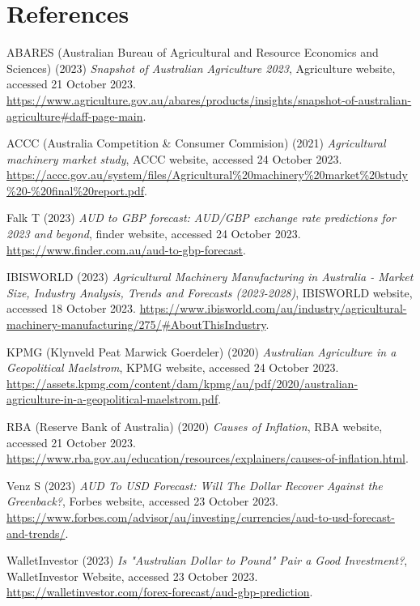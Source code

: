 \documentclass{article}
\begin{document}
\break

\section*{References}

\vspace{1em}

\noindent
ABARES (Australian Bureau of Agricultural and Resource Economics and Sciences) (2023) \emph{Snapshot of Australian Agriculture 2023}, Agriculture website, accessed 21 October 2023. \url{https://www.agriculture.gov.au/abares/products/insights/snapshot-of-australian-agriculture#daff-page-main}.

\vspace{1em}

\noindent
ACCC (Australia Competition \& Consumer Commision) (2021) \emph{Agricultural machinery market study}, ACCC website, accessed 24 October 2023. \url{https://accc.gov.au/system/files/Agricultural%20machinery%20market%20study%20-%20final%20report.pdf}.

\vspace{1em}

\noindent
Falk T (2023) \emph{AUD to GBP forecast: AUD/GBP exchange rate predictions for 2023 and beyond}, finder website, accessed 24 October 2023. \url{https://www.finder.com.au/aud-to-gbp-forecast}.

\vspace{1em}

\noindent
IBISWORLD (2023) \emph{Agricultural Machinery Manufacturing in Australia - Market Size, Industry Analysis, Trends and Forecasts (2023-2028)}, IBISWORLD website, accessed 18 October 2023. \url{https://www.ibisworld.com/au/industry/agricultural-machinery-manufacturing/275/#AboutThisIndustry}.

\vspace{1em}

\noindent
KPMG (Klynveld Peat Marwick Goerdeler) (2020) \emph{Australian Agriculture in a Geopolitical Maelstrom}, KPMG website, accessed 24 October 2023. \url{https://assets.kpmg.com/content/dam/kpmg/au/pdf/2020/australian-agriculture-in-a-geopolitical-maelstrom.pdf}.

\vspace{1em}

\noindent
RBA (Reserve Bank of Australia) (2020) \emph{Causes of Inflation}, RBA website, accessed 21 October 2023. \url{https://www.rba.gov.au/education/resources/explainers/causes-of-inflation.html}.

\vspace{1em}

\noindent
Venz S (2023) \emph{AUD To USD Forecast: Will The Dollar Recover Against the Greenback?}, Forbes website, accessed 23 October 2023. \url{https://www.forbes.com/advisor/au/investing/currencies/aud-to-usd-forecast-and-trends/}.

\vspace{1em}

\noindent
WalletInvestor (2023) \emph{Is "Australian Dollar to Pound" Pair a Good Investment?}, WalletInvestor Website, accessed 23 October 2023. \url{https://walletinvestor.com/forex-forecast/aud-gbp-prediction}.
\end{document}
